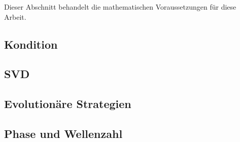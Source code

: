 Dieser Abschnitt behandelt die mathematischen Voraussetzungen für diese Arbeit.
%
\subsection{Kondition}
\label{sec:condition}

%
\subsection{SVD}
\label{sec:svd}

%
\subsection{Evolutionäre Strategien}
\label{sec:es-common}

%
\subsection{Phase und Wellenzahl}
\label{sec:wavenumber}


%